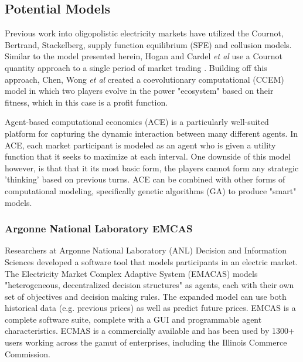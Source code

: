\documentclass[12pt]{article}
\begin{document}
\subsection{Potential Models}

Previous work into oligopolistic electricity markets have utilized the Cournot, Bertrand, Stackelberg, supply function equilibrium (SFE) and collusion models. Similar to the model presented herein, Hogan and Cardel \emph{et al} use a Cournot quantity approach to a single period of market trading \cite{hogan}. Building off this approach, Chen, Wong \emph{et al} created a coevolutionary computational (CCEM) model in which two players evolve in the power "ecosystem" based on their fitness, which in this case is a profit function\cite{chen}. \*

Agent-based computational economics (ACE) is a particularly well-suited platform for capturing the dynamic interaction between many different agents. In ACE, each market participant is modeled as an agent who is given a utility function that it seeks to maximize at each interval. One downside of this model however, is that that it its most basic form, the players cannot form any strategic 'thinking' based on previous turns. ACE can be combined with other forms of computational modeling, specifically genetic algorithms (GA) to produce "smart" models. \*

\subsubsection{Argonne National Laboratory EMCAS}
Researchers at Argonne National Laboratory (ANL) Decision and Information Sciences developed a software tool that models participants in an electric market. The Electricity Market Complex Adaptive System (EMACAS) models "heterogeneous, decentralized decision structures"\cite{EMCAS} as agents, each with their own set of objectives and decision making rules. The expanded model can use both historical data (e.g. previous prices) as well as predict future prices. EMCAS is a complete software suite, complete with a GUI and programmable agent characteristics. ECMAS is a commercially available and has been used by 1300+ users working across the gamut of enterprises, including the Illinois Commerce Commission. \*
\end{document}
